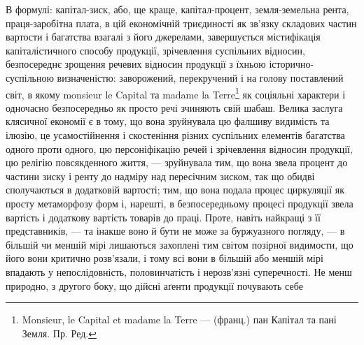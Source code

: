 В формулі: капітал-зиск, або, ще краще, капітал-процент, земля-земельна
рента, праця-заробітна плата, в цій економічній триєдиності як зв’язку
складових частин вартости і багатства взагалі з його джерелами, завершується
містифікація капіталістичного способу продукції, зрічевлення суспільних відносин,
безпосереднє зрощення речевих відносин продукції з їхньою історично-суспільною
визначеністю: заворожений, перекручений і на голову поставлений
світ, в якому monsieur le Capital та madame la Terre\footnote*{
Monsieur, le Capital et madame la Terre — (франц.) пан Капітал та пані Земля. Пр. Ред.
} як соціяльні характери
і одночасно безпосередньо як просто речі зчиняють свій шабаш. Велика заслуга
клясичної економії є в тому, що вона зруйнувала цю фалшиву видимість
та ілюзію, це усамостійнення і скостеніння різних суспільних елементів
багатства одного проти одного, цю персоніфікацію речей і зрічевлення
відносин продукції, цю релігію повсякденного життя, — зруйнувала тим, що вона
звела процент до частини зиску і ренту до надміру над пересічним зиском, так
що обидві сполучаються в додатковій вартості; тим, що вона подала процес
циркуляції як просту метаморфозу форм і, нарешті, в безпосередньому процесі
продукції звела вартість і додаткову вартість товарів до праці. Проте, навіть
найкращі з її представників, — та інакше воно й бути не може за буржуазного
погляду, — в більшій чи меншій мірі лишаються захоплені тим світом позірної
видимости, що його вони критично розв’язали, і тому всі вони в більшій або меншій
мірі впадають у непослідовність, половинчатість і нерозв’язні суперечності.
Не менш природно, з другого боку, що дійсні аґенти продукції почувають себе